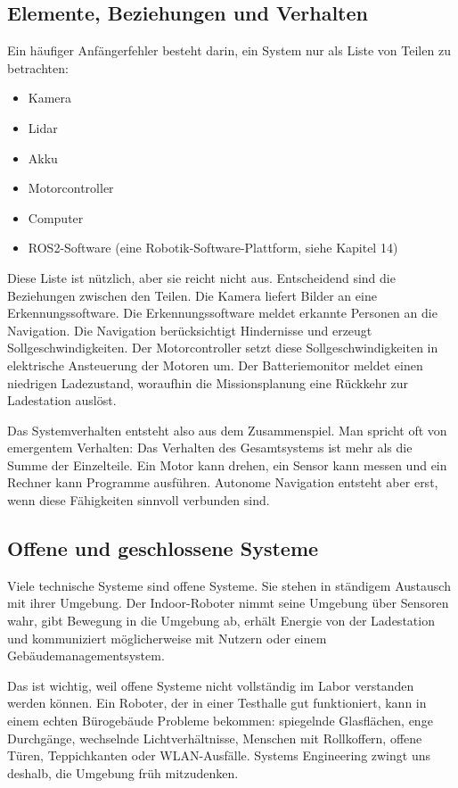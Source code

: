 \subsection{Elemente, Beziehungen und Verhalten}
Ein häufiger Anfängerfehler besteht darin, ein System nur als Liste von Teilen zu betrachten:

\begin{itemize}
    \item Kamera
    \item Lidar
    \item Akku
    \item Motorcontroller
    \item Computer
    \item ROS2-Software (eine Robotik-Software-Plattform, siehe Kapitel 14)
\end{itemize}

Diese Liste ist nützlich, aber sie reicht nicht aus. Entscheidend sind die Beziehungen zwischen den Teilen. Die Kamera liefert Bilder an eine Erkennungssoftware. Die Erkennungssoftware meldet erkannte Personen an die Navigation. Die Navigation berücksichtigt Hindernisse und erzeugt Sollgeschwindigkeiten. Der Motorcontroller setzt diese Sollgeschwindigkeiten in elektrische Ansteuerung der Motoren um. Der Batteriemonitor meldet einen niedrigen Ladezustand, woraufhin die Missionsplanung eine Rückkehr zur Ladestation auslöst.

Das Systemverhalten entsteht also aus dem Zusammenspiel. Man spricht oft von emergentem Verhalten: Das Verhalten des Gesamtsystems ist mehr als die Summe der Einzelteile. Ein Motor kann drehen, ein Sensor kann messen und ein Rechner kann Programme ausführen. Autonome Navigation entsteht aber erst, wenn diese Fähigkeiten sinnvoll verbunden sind.

\subsection{Offene und geschlossene Systeme}
Viele technische Systeme sind offene Systeme. Sie stehen in ständigem Austausch mit ihrer Umgebung. Der Indoor-Roboter nimmt seine Umgebung über Sensoren wahr, gibt Bewegung in die Umgebung ab, erhält Energie von der Ladestation und kommuniziert möglicherweise mit Nutzern oder einem Gebäudemanagementsystem.

Das ist wichtig, weil offene Systeme nicht vollständig im Labor verstanden werden können. Ein Roboter, der in einer Testhalle gut funktioniert, kann in einem echten Bürogebäude Probleme bekommen: spiegelnde Glasflächen, enge Durchgänge, wechselnde Lichtverhältnisse, Menschen mit Rollkoffern, offene Türen, Teppichkanten oder WLAN-Ausfälle. Systems Engineering zwingt uns deshalb, die Umgebung früh mitzudenken.

